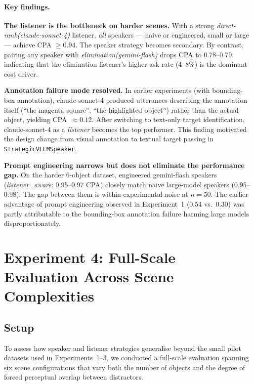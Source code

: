 \documentclass[11pt]{article}
\begin{document}
\paragraph{Key findings.}

\textbf{The listener is the bottleneck on harder scenes.}
With a strong \textit{direct-rank(claude-sonnet-4)} listener, \emph{all} speakers
--- naive or engineered, small or large --- achieve CPA $\geq 0.94$.  The speaker
strategy becomes secondary.  By contrast, pairing any speaker with
\textit{elimination(gemini-flash)} drops CPA to 0.78--0.79, indicating that the
elimination listener's higher ask rate (4--8\%) is the dominant cost driver.

\textbf{Annotation failure mode resolved.}
In earlier experiments (with bounding-box annotation), claude-sonnet-4 produced
utterances describing the annotation itself (``the magenta square'', ``the highlighted
object'') rather than the actual object, yielding CPA~${\approx}0.12$.
After switching to text-only target identification, claude-sonnet-4 as a
\emph{listener} becomes the top performer.  This finding motivated the design
change from visual annotation to textual target passing in \texttt{StrategicVLLMSpeaker}.

\textbf{Prompt engineering narrows but does not eliminate the performance gap.}
On the harder 6-object dataset, engineered gemini-flash speakers
(\textit{listener\_aware}: 0.95--0.97 CPA) closely match naive large-model speakers
(0.95--0.98).  The gap between them is within experimental noise at $n{=}50$.
The earlier advantage of prompt engineering observed in Experiment~1 (0.54 vs.\ 0.30)
was partly attributable to the bounding-box annotation failure harming large models
disproportionately.

\section{Experiment 4: Full-Scale Evaluation Across Scene Complexities}
\label{sec:fullscale}

\subsection{Setup}

To assess how speaker and listener strategies generalise beyond the small
pilot datasets used in Experiments~1--3, we conducted a full-scale evaluation
spanning six scene configurations that vary both the number of objects and the
degree of forced perceptual overlap between distractors.
\end{document}
